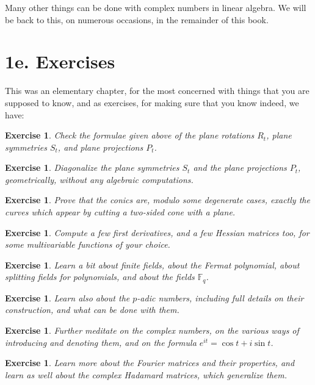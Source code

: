 \documentclass[12pt]{amsbook}
\newtheorem{exercise}[theorem]{Exercise}
\begin{document}
Many other things can be done with complex numbers in linear algebra. We will be back to this, on numerous occasions, in the remainder of this book.

\section*{1e. Exercises}

This was an elementary chapter, for the most concerned with things that you are supposed to know, and as exercises, for making sure that you know indeed, we have:

\begin{exercise}
Check the formulae given above of the plane rotations $R_t$, plane symmetries $S_t$, and plane projections $P_t$.
\end{exercise}

\begin{exercise}
Diagonalize the plane symmetries $S_t$ and the plane projections $P_t$, geometrically, without any algebraic computations.
\end{exercise}

\begin{exercise}
Prove that the conics are, modulo some degenerate cases, exactly the curves which appear by cutting a two-sided cone with a plane.
\end{exercise}

\begin{exercise}
Compute a few first derivatives, and a few Hessian matrices too, for some multivariable functions of your choice.
\end{exercise}

\begin{exercise}
Learn a bit about finite fields, about the Fermat polynomial, about splitting fields for polynomials, and about the fields $\mathbb F_q$.
\end{exercise}

\begin{exercise}
Learn also about the $p$-adic numbers, including full details on their construction, and what can be done with them.
\end{exercise}

\begin{exercise}
Further meditate on the complex numbers, on the various ways of introducing and denoting them, and on the formula $e^{it}=\cos t+i\sin t$.
\end{exercise}

\begin{exercise}
Learn more about the Fourier matrices and their properties, and learn as well about the complex Hadamard matrices, which generalize them.
\end{exercise}
\end{document}
